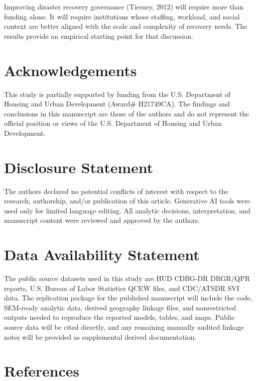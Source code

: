 \documentclass[
  number]{elsarticle}
\begin{document}
Improving disaster recovery governance (Tierney, 2012) will require more
than funding alone. It will require institutions whose staffing,
workload, and social context are better aligned with the scale and
complexity of recovery needs. The results provide an empirical starting
point for that discussion.

\section*{Acknowledgements}\label{acknowledgements}

This study is partially supported by funding from the U.S. Department of
Housing and Urban Development (Award\# H21749CA). The findings and
conclusions in this manuscript are those of the authors and do not
represent the official position or views of the U.S. Department of
Housing and Urban Development.

\section*{Disclosure Statement}\label{disclosure-statement}

The authors declared no potential conflicts of interest with respect to
the research, authorship, and/or publication of this article. Generative
AI tools were used only for limited language editing. All analytic
decisions, interpretation, and manuscript content were reviewed and
approved by the authors.

\section*{Data Availability
Statement}\label{data-availability-statement}

The public source datasets used in this study are HUD CDBG-DR DRGR/QPR
reports, U.S. Bureau of Labor Statistics QCEW files, and CDC/ATSDR SVI
data. The replication package for the published manuscript will include
the code, SEM-ready analytic data, derived geography linkage files, and
nonrestricted outputs needed to reproduce the reported models, tables,
and maps. Public source data will be cited directly, and any remaining
manually audited linkage notes will be provided as supplemental derived
documentation.

\section*{References}\label{references}
\end{document}
